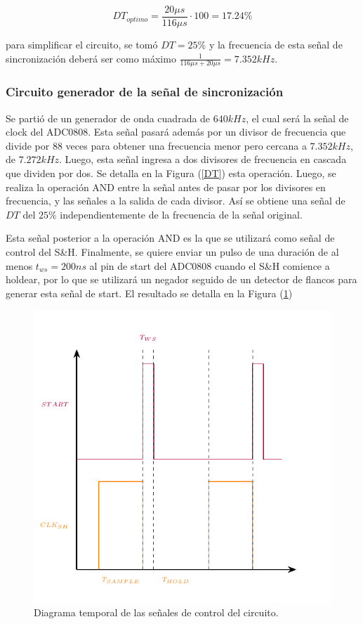 \begin{equation}
DT_{optimo} = \frac{20\mu s}{116\mu s}\cdot 100 = 17.24\% 
\end{equation}

para simplificar el circuito, se tomó $DT = 25\%$ y la frecuencia de esta señal de sincronización deberá ser como máximo $\frac{1}{116\mu s + 20\mu s} = 7.352kHz$.

\subsubsection{Circuito generador de la señal de sincronización}

Se partió de un generador de onda cuadrada de $640kHz$, el cual será la señal de clock del ADC0808. Esta señal pasará además por un divisor de frecuencia que divide por $88$ veces para obtener una frecuencia menor pero cercana a $7.352kHz$, de $7.272kHz$. Luego, esta señal ingresa a dos divisores de frecuencia en cascada que dividen por dos. Se detalla en la Figura (\ref{DT}) esta operación. Luego, se realiza la operación AND entre la señal antes de pasar por los divisores en frecuencia, y las señales a la salida de cada divisor. Así se obtiene una señal de $DT$ del $25\%$ independientemente de la frecuencia de la señal original.


Esta señal posterior a la operación AND es la que se utilizará como señal de control del S\&H. Finalmente, se quiere enviar un pulso de una duración de al menos $t_{ws} = 200ns$ al pin de start del ADC0808 cuando el S\&H comience a holdear, por lo que se utilizará un negador seguido de un detector de flancos para generar esta señal de start. El resultado se detalla en la Figura (\ref{START})

\begin{figure}[H]
\centering
\includegraphics[width=0.8\linewidth]{ImagenesEjercicio1/Graficos.pdf}
\caption{Diagrama temporal de las señales de control del circuito.}
\label{START}
\end{figure}

